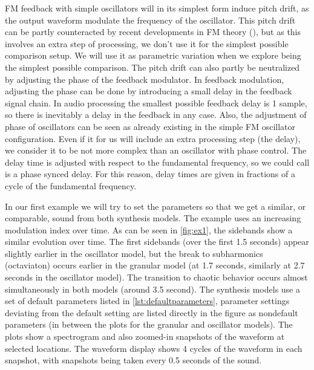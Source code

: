 \documentclass[runningheads,a4paper]{llncs}
\begin{document}
FM feedback with simple oscillators will in its simplest form induce pitch drift, as the output waveform modulate the frequency of the oscillator. This pitch drift can be partly counteracted by recent developments in FM theory (\cite{Lazzarini-2024}), but as this involves an extra step of processing, we don't use it for the simplest possible comparison setup. We will use it as parametric variation when we explore being the simplest possible comparison. The pitch drift can also partly be neutralized by adjusting the phase of the feedback modulator. In feedback modulation, adjusting the phase can be done by introducing a small delay in the feedback signal chain. In audio processing the smallest possible feedback delay is 1 sample, so there is inevitably a delay in the feedback in any case. Also, the adjustment of phase of oscillators can be seen as already existing in the simple FM oscillator configuration. Even if it for us will include an extra processing step (the delay), we consider it to be not more complex than an oscillator with phase control. The delay time is adjusted with respect to the fundamental frequency, so we could call is a phase synced delay. For this reason, delay times are given in fractions of a cycle of the fundamental frequency. 

In our first example we will try to set the parameters so that we get a similar, or comparable, sound from both synthesis models. The example uses an increasing modulation index over time. As can be seen in \ref{fig:ex1}, the sidebands show a similar evolution over time. The first sidebands (over the first 1.5 seconds) appear slightly earlier in the oscillator model, but the break to subharmonics (octaviaton) occurs earlier in the granular model (at 1.7 seconds, similarly at 2.7 seconds in the oscillator model). The transition to chaotic behavior occurs almost simultaneously in both models (around 3.5 second). The synthesis models use a set of default parameters listed in \ref{lst:defaultparameters}, parameter settings deviating from the default setting are listed directly in the figure as nondefault parameters (in between the plots for the granular and oscillator models). The plots show a spectrogram and also zoomed-in snapshots of the waveform at selected locations. The waveform display shows 4 cycles of the waveform in each snapshot, with snapshots being taken every 0.5 seconds of the sound.
\end{document}
